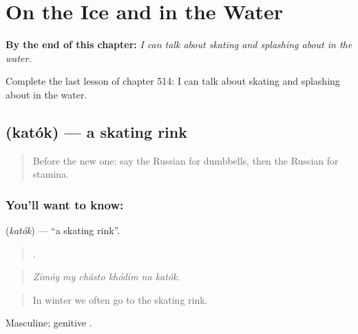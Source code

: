 
\chapter{On the Ice and in the Water}
\label{ch:ru-on-the-ice-and-in-the-water}

\begin{chapteropening}
\textbf{By the end of this chapter:} \emph{I can talk about skating and splashing about in the water.}

Complete the last lesson of chapter 514: I can talk about skating and splashing about in the water.
\end{chapteropening}

\section[\texorpdfstring{\ru{каток} (katók)}{каток (katók)}]{ (katók) — a skating rink}

\label{lesson:RU-C514-katok}



\begin{quote}
Before the new one: say the Russian for dumbbells, then the Russian for stamina.
\end{quote}

\subsection*{You'll want to know: }
\textbf{} (\emph{katók}) — \textquotedblleft{}a skating rink\textquotedblright{}.

\begin{quote}
     .
\end{quote}

\begin{quote}
\emph{Zimóy my chásto khódim na katók.}
\end{quote}

\begin{quote}
In winter we often go to the skating rink.
\end{quote}

Masculine; genitive .

